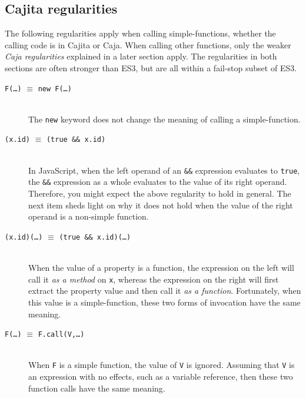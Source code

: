 \documentclass[letterpaper,twocolumn,10pt]{article}
\newcommand{\code}[1]{{\tt {#1}}}              %
\begin{document}
\subsection{Cajita regularities}

The following regularities apply when calling simple-functions, whether the 
calling code is in Cajita or Caja. When calling other functions, only the 
weaker \emph{Caja regularities} explained in a later section apply. The 
regularities in both sections are often stronger than ES3, but are all within 
a fail-stop subset of ES3.

\begin{description}
  \item[\code{F(\ldots)} $\equiv$ \code{new F(\ldots)}]
  
  \ \\
  The \code{new} keyword does not change the meaning of calling a 
  simple-function.
  
  \item[\code{(x.id)} $\equiv$ \code{(true \&\& x.id)}]
  
  \ \\
  In JavaScript, when the left operand of an \code{\&\&} expression evaluates 
  to \code{true}, the \code{\&\&} expression as a whole evaluates to the 
  value of its right operand. Therefore, you might expect the above 
  regularity to hold in general. The next item sheds light on why it does not 
  hold when the value of the right operand is a non-simple function.

  \item[\code{(x.id)(\ldots)} $\equiv$ \code{(true \&\& x.id)(\ldots)}]
  
  \ \\
  When the value of a property is a function, the expression on the left will 
  call it \emph{as a method} on \code{x}, whereas the expression on the right 
  will first extract the property value and then call it \emph{as a 
  function}. Fortunately, when this value is a simple-function, these two 
  forms of invocation have the same meaning.

  \item[\code{F(\ldots)} $\equiv$ \code{F.call(V,\ldots)}]
  
  \ \\
  When \code{F} is a simple function, the value of \code{V} is ignored. 
  Assuming that \code{V} is an expression with no effects, such as a variable 
  reference, then these two function calls have the same meaning.
  

\end{description}
\end{document}
